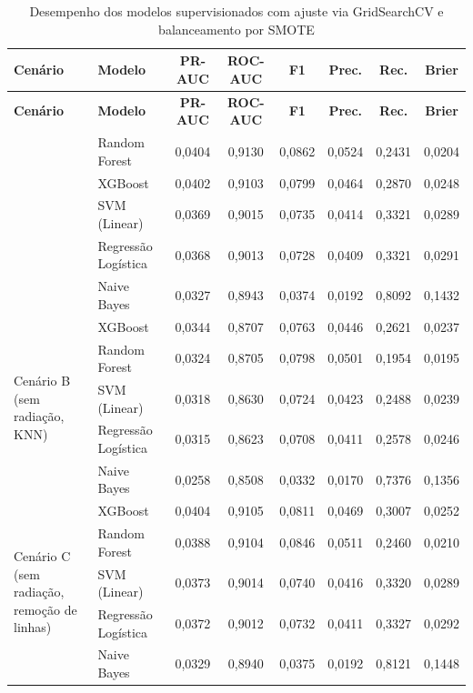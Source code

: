 \begin{longtable}{p{3.2cm} l c c c c c c}
\caption{Desempenho dos modelos supervisionados com ajuste via GridSearchCV e balanceamento por SMOTE}
\label{tab:resultados_grid_smote} \\
\toprule
\textbf{Cenário} & \textbf{Modelo} & \textbf{PR-AUC} & \textbf{ROC-AUC} & \textbf{F1} & \textbf{Prec.} & \textbf{Rec.} & \textbf{Brier} \\
\midrule
\endfirsthead

\toprule
\textbf{Cenário} & \textbf{Modelo} & \textbf{PR-AUC} & \textbf{ROC-AUC} & \textbf{F1} & \textbf{Prec.} & \textbf{Rec.} & \textbf{Brier} \\
\midrule
\endhead

\bottomrule
\endfoot

\bottomrule
\endlastfoot

\multirow{5}{*}{\parbox{3.2cm}{\centering Cenário A\\(sem radiação)}} 
   & Random Forest       & 0,0404 & 0,9130 & 0,0862 & 0,0524 & 0,2431 & 0,0204 \\
   & XGBoost             & 0,0402 & 0,9103 & 0,0799 & 0,0464 & 0,2870 & 0,0248 \\
   & SVM (Linear)        & 0,0369 & 0,9015 & 0,0735 & 0,0414 & 0,3321 & 0,0289 \\
   & Regressão Logística & 0,0368 & 0,9013 & 0,0728 & 0,0409 & 0,3321 & 0,0291 \\
   & Naive Bayes         & 0,0327 & 0,8943 & 0,0374 & 0,0192 & 0,8092 & 0,1432 \\
\midrule

\multirow{5}{*}{\parbox{3.2cm}{\centering Cenário B\\(sem radiação, KNN)}} 
   & XGBoost             & 0,0344 & 0,8707 & 0,0763 & 0,0446 & 0,2621 & 0,0237 \\
   & Random Forest       & 0,0324 & 0,8705 & 0,0798 & 0,0501 & 0,1954 & 0,0195 \\
   & SVM (Linear)        & 0,0318 & 0,8630 & 0,0724 & 0,0423 & 0,2488 & 0,0239 \\
   & Regressão Logística & 0,0315 & 0,8623 & 0,0708 & 0,0411 & 0,2578 & 0,0246 \\
   & Naive Bayes         & 0,0258 & 0,8508 & 0,0332 & 0,0170 & 0,7376 & 0,1356 \\
\midrule

\multirow{5}{*}{\parbox{3.2cm}{\centering Cenário C\\(sem radiação, remoção de linhas)}} 
   & XGBoost             & 0,0404 & 0,9105 & 0,0811 & 0,0469 & 0,3007 & 0,0252 \\
   & Random Forest       & 0,0388 & 0,9104 & 0,0846 & 0,0511 & 0,2460 & 0,0210 \\
   & SVM (Linear)        & 0,0373 & 0,9014 & 0,0740 & 0,0416 & 0,3320 & 0,0289 \\
   & Regressão Logística & 0,0372 & 0,9012 & 0,0732 & 0,0411 & 0,3327 & 0,0292 \\
   & Naive Bayes         & 0,0329 & 0,8940 & 0,0375 & 0,0192 & 0,8121 & 0,1448 \\
\midrule


\end{longtable}
